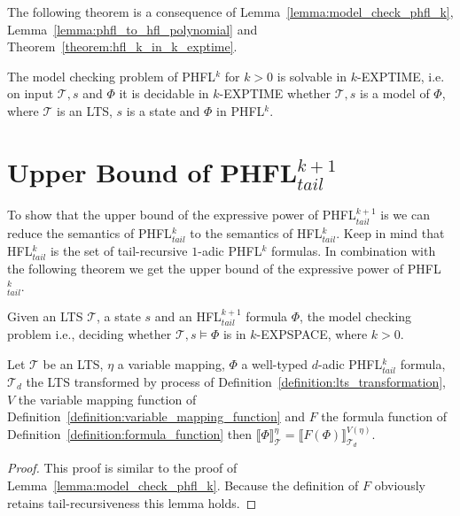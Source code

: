 The following theorem is a consequence of Lemma~\ref{lemma:model_check_phfl_k}, Lemma~\ref{lemma:phfl_to_hfl_polynomial} and Theorem~\ref{theorem:hfl_k_in_k_exptime}.

\begin{theorem}
    \label{theorem:phfl_k_in_k_exptime}
	The model checking problem of PHFL$^k$ for $k > 0$ is solvable in $k$-EXPTIME, i.e. on input $\mathcal{T}, s$ and $\Phi$ it is decidable in $k$-EXPTIME whether $\mathcal{T}, s$ is a model of $\Phi$, where $\mathcal{T}$ is an LTS, $s$ is a state and $\Phi$ in PHFL$^k$.    
\end{theorem}

\section{Upper Bound of PHFL$^{k+1}_{tail}$}

To show that the upper bound of the expressive power of PHFL$^{k + 1}_{tail}$ is  we can reduce the semantics of
PHFL$^{k}_{tail}$ to the semantics of HFL$^k_{tail}$. Keep in mind that HFL$^k_{tail}$ is the set of tail-recursive
$1$-adic PHFL$^k$ formulas. In combination with the following theorem we get the upper bound
of the expressive power of PHFL$^k_{tail}$.

\begin{theorem}{\cite{bruse2017space}}
    \label{theorem:hfl_k_plus_1_in_k_expspace}
    Given an LTS $\mathcal{T}$, a state $s$ and an HFL$^{k + 1}_{tail}$ formula $\Phi$, the model checking problem i.e., deciding whether
    $\mathcal{T}, s \models \Phi$ is in $k$-EXPSPACE, where $k > 0$.
\end{theorem}

\begin{lemma}
    \label{lemma:model_check_phfl_k_tail}
    Let $\mathcal{T}$ be an LTS, $\eta$ a variable mapping, $\Phi$ a well-typed $d$-adic
    PHFL$^k_{tail}$ formula, $\mathcal{T}_d$ the LTS transformed by process of
    Definition~\ref{definition:lts_transformation},
    $V$ the variable mapping function of Definition~\ref{definition:variable_mapping_function}
    and $F$ the formula function of Definition~\ref{definition:formula_function} then $\llbracket \Phi \rrbracket^\eta_\mathcal{T} = \llbracket F(\Phi)
    \rrbracket^{V(\eta)}_{\mathcal{T}_d}$.
\end{lemma}

\begin{proof}
    This proof is similar to the proof of Lemma~\ref{lemma:model_check_phfl_k}. Because the definition of $F$ obviously retains tail-recursiveness this lemma holds.
\end{proof}

